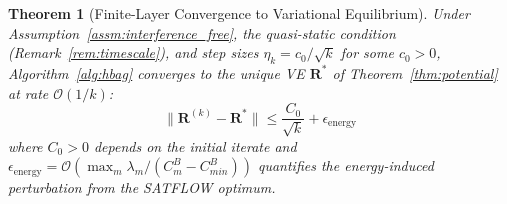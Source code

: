 \documentclass[journal]{IEEEtran}
\newtheorem{theorem}{Theorem}
\newcommand{\CB}{C^{B}}
\newcommand{\CBmin}{C^{B}_{min}}
\newcommand{\bfR}{\mathbf{R}}
\begin{document}
\begin{theorem}[Finite-Layer Convergence to Variational Equilibrium]
\label{thm:convergence}
Under Assumption~\ref{assm:interference_free}, the quasi-static condition (Remark~\ref{rem:timescale}), and step sizes $\eta_k = c_0/\sqrt{k}$ for some $c_0>0$, Algorithm~\ref{alg:hbag} converges to the unique VE $\bfR^*$ of Theorem~\ref{thm:potential} at rate $\mathcal{O}(1/k)$:
\begin{equation}
    \|\bfR^{(k)} - \bfR^*\|
    \leq \frac{C_0}{\sqrt{k}}
    + \epsilon_{\mathrm{energy}}
    \label{eq:convergence_rate}
\end{equation}
where $C_0>0$ depends on the initial iterate and $\epsilon_{\mathrm{energy}} = \mathcal{O}(\max_m
\lambda_m/(\CB_m-\CBmin))$
quantifies the energy-induced perturbation from the SATFLOW optimum.
\end{theorem}
\end{document}
